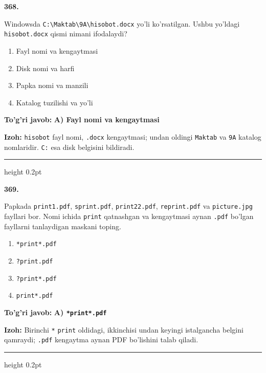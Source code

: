 \documentclass[10pt,a4paper]{article}
\begin{document}
{\bfseries\sffamily\color{ink} 368.}
\par
Windowsda \texttt{C:\textbackslash{}Maktab\textbackslash{}9A\textbackslash{}hisobot.docx} yo'li ko'rsatilgan. Ushbu yo'ldagi \texttt{hisobot.docx} qismi nimani ifodalaydi?
\begin{enumerate}[label=\Alph*),leftmargin=9mm]
\item Fayl nomi va kengaytmasi
\item Disk nomi va harfi
\item Papka nomi va manzili
\item Katalog tuzilishi va yo'li
\end{enumerate}
\begin{tcolorbox}[enhanced,breakable,colback=teal!4,colframe=teal!60!black,boxrule=0.45pt,arc=1.2mm,left=2.7mm,right=2.7mm,top=1.8mm,bottom=1.8mm,before skip=2mm,after skip=2mm]
{\bfseries\sffamily\color{teal}To'g'ri javob:} \textbf{A) Fayl nomi va kengaytmasi}
\par\smallskip
{\bfseries Izoh:} \texttt{hisobot} fayl nomi, \texttt{.docx} kengaytmasi; undan oldingi \texttt{Maktab} va \texttt{9A} katalog nomlaridir. \texttt{C:} esa disk belgisini bildiradi.
\end{tcolorbox}
\vspace{2mm}\hrule height 0.2pt\vspace{3mm}

{\bfseries\sffamily\color{ink} 369.}
\par
Papkada \texttt{print1.pdf}, \texttt{sprint.pdf}, \texttt{print22.pdf}, \texttt{reprint.pdf} va \texttt{picture.jpg} fayllari bor. Nomi ichida \texttt{print} qatnashgan va kengaytmasi aynan \texttt{.pdf} bo'lgan fayllarni tanlaydigan maskani toping.
\begin{enumerate}[label=\Alph*),leftmargin=9mm]
\item \texttt{*print*.pdf}
\item \texttt{?print.pdf}
\item \texttt{?print*.pdf}
\item \texttt{print*.pdf}
\end{enumerate}
\begin{tcolorbox}[enhanced,breakable,colback=teal!4,colframe=teal!60!black,boxrule=0.45pt,arc=1.2mm,left=2.7mm,right=2.7mm,top=1.8mm,bottom=1.8mm,before skip=2mm,after skip=2mm]
{\bfseries\sffamily\color{teal}To'g'ri javob:} \textbf{A) \texttt{*print*.pdf}}
\par\smallskip
{\bfseries Izoh:} Birinchi \texttt{*} \texttt{print} oldidagi, ikkinchisi undan keyingi istalgancha belgini qamraydi; \texttt{.pdf} kengaytma aynan PDF bo'lishini talab qiladi.
\end{tcolorbox}
\vspace{2mm}\hrule height 0.2pt\vspace{3mm}
\end{document}
